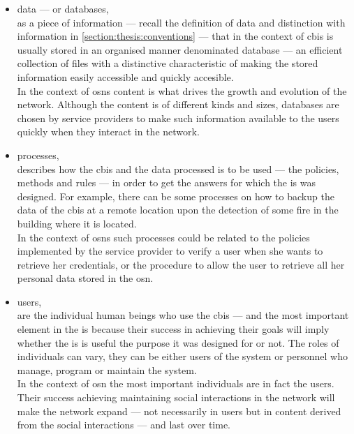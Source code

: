 \begin{itemize}
    \item data --- or databases,\\
    as a piece of information --- recall the definition of data and distinction 
    with information in \cref{section:thesis:conventions} --- that in the context of \ac{cbis}
    is usually stored in an organised manner denominated database --- an efficient 
    collection of files with a distinctive characteristic of making the stored information 
    easily accessible and quickly accesible.\\
    In the context of \acp{osn} content is what drives the growth and evolution 
    of the network. Although the content is of different kinds and sizes, databases 
    are chosen by service providers to make such information available to the users 
    quickly when they interact in the network.
    
    \item processes,\\
    describes how the \ac{cbis} and the data processed is to be used --- the policies, 
    methods and rules --- in order to get the answers for which the \ac{is} was 
    designed. For example, there can be some processes on how to backup the data 
    of the \ac{cbis} at a remote location upon the detection of some fire in the 
    building where it is located.\\
    In the context of \acp{osn} such processes could be related to the policies 
    implemented by the service provider to verify a user when she wants to retrieve 
    her credentials, or the procedure to allow the user to retrieve all her personal 
    data stored in the \ac{osn}.
    
    \item users,\\
    are the individual human beings who use the \ac{cbis} --- and the most important 
    element in the \ac{is} because their success in achieving their goals will imply 
    whether the \ac{is} is useful the purpose it was designed for or not. The roles 
    of individuals can vary, they can be either users of the system or personnel 
    who manage, program or maintain the system.\\
    In the context of \ac{osn} the most important individuals are in fact the users. 
    Their success achieving maintaining social interactions in the network will 
    make the network expand --- not necessarily in users but in content derived 
    from the social interactions --- and last over time.
    
\end{itemize}

